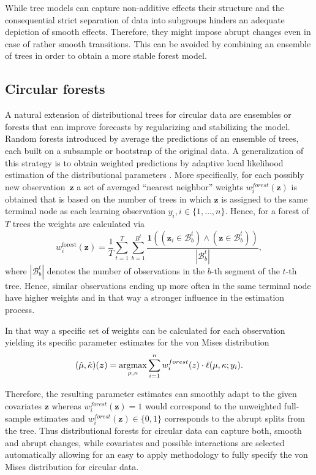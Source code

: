 \documentclass[nojss]{jss}
\numberwithin{equation}{section}
\begin{document}
While tree models can capture non-additive effects their structure and the consequential strict 
separation of data into subgroups hinders an adequate depiction of smooth effects. Therefore, 
they might impose abrupt changes even in case of rather smooth transitions. This can be avoided 
by combining an ensemble of trees in order to obtain a more stable forest model. 


\subsection{Circular forests}
\label{sec:circforest}
A natural extension of distributional trees for circular data are ensembles or forests 
that can improve forecasts by regularizing and stabilizing the model.
Random forests introduced by \cite{Breiman:2001} average the predictions of an ensemble
of trees, each built on a subsample or bootstrap of the original data. 
A generalization of this strategy is to obtain weighted predictions by adaptive local 
likelihood estimation of the distributional parameters 
\citep[Section~2.3. of][]{Schlosser+Hothorn+Stauffer:2019, Hothorn+Zeileis:2017}. 
More specifically, for each possibly new observation~$\bm{z}$ a set of averaged ``nearest neighbor''
weights $w_i^{forest}(\bm{z})$ 
is obtained that is based on the number of trees in which $\bm{z}$ is assigned to the same terminal 
node as each learning observation $y_i, i \in \{1,\ldots,n\}$.
Hence, for a forest of $T$ trees the weights are calculated via
\begin{equation}
w^{\text{forest}}_i(\bm{z}) = \frac{1}{T} \sum_{t=1}^T \sum_{b=1}^{B^t}
\frac{\mathbf{1}((\bm{z}_i \in \mathcal{B}^t_b) \land (\bm{z} \in \mathcal{B}^t_b))}{|\mathcal{B}^t_b|},
\end{equation}
where $|\mathcal{B}^t_b|$ denotes the number of observations in the $b$-th
segment of the $t$-th tree.
Hence, similar observations ending up more often in the same terminal node have higher weights
and in that way a stronger influence in the estimation process.

In that way a specific set of weights can be calculated for each observation yielding
its specific parameter estimates for the von Mises distribution
\begin{equation}
(\hat{\mu},\hat{\kappa})(\bm{z}) = \operatorname{argmax}\displaylimits_{\mu, \kappa} \sum_{i=1}^n w_i^{forest}(z) \cdot \ell(\mu, \kappa; y_i). 
\end{equation}

Therefore, the resulting parameter estimates can smoothly adapt to the given
covariates $\bm{z}$ whereas $w_i^{forest}(\bm{z}) = 1$ would correspond to the unweighted
full-sample estimates and $w_i^{forest}(\bm{z}) \in \{0, 1\}$ corresponds to the abrupt
splits from the tree.
Thus distributional forests for circular data can capture both, smooth and abrupt changes, while
covariates and possible interactions are selected automatically allowing for an easy to
apply methodology to fully specify the von Mises distribution for circular data.
\end{document}
